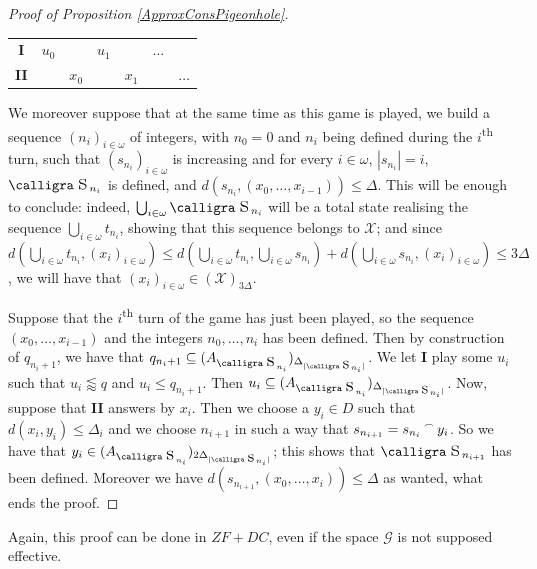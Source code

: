 \documentclass[a4paper,11pt]{article}
\theoremstyle{definition}
\numberwithin{equation}{section}
\newcommand{\X}{\mathcal{X}}
\newcommand{\G}{\mathcal{G}}
\newcommand{\I}{\textbf{I}}
\newcommand{\II}{\textbf{II}}
\newcommand{\st}{\text{{\calligra \LARGE s}}\,}
\newcommand{\stp}{\text{{\calligra \large s}}\,}
\newcommand{\Asti}[1]{A_{{\text{{\calligra \Large s}}\,}_{#1}}}
\newcommand{\concat}{%
  \mathbin{\raisebox{1ex}{\scalebox{.7}{$\frown$}}}%
}
\begin{document}
\begin{proof}[Proof of Proposition \ref{ApproxConsPigeonhole}]
\smallskip

\begin{tabular}{ccccccc}
\textbf{I} & $u_0$ & & $u_1$ & & $\hdots$ & \\
\textbf{II} & & $x_0$ & & $x_1$ & & $\hdots$ 
\end{tabular}

\smallskip

\noindent We moreover suppose that at the same time as this game is played, we build a sequence $(n_i)_{i \in \omega}$ of integers, with $n_0 = 0$ and $n_i$ being defined during the $i$\textsuperscript{th} turn, such that $(s_{n_i})_{i \in \omega}$ is increasing and for every $i \in \omega$, $|s_{n_i}| = i$, $\st_{n_i}$ is defined, and $d(s_{n_i}, (x_0, \ldots, x_{i - 1})) \leqslant \Delta$. This will be enough to conclude: indeed, $\bigcup_{i \in \omega} \st_{n_i}$ will be a total state realising the sequence $\bigcup_{i \in \omega} t_{n_i}$, showing that this sequence belongs to $\X$; and since $d\left(\bigcup_{i \in \omega} t_{n_i}, (x_i)_{i \in \omega}\right) \leqslant d\left(\bigcup_{i \in \omega} t_{n_i}, \bigcup_{i \in \omega} s_{n_i}\right) + d\left(\bigcup_{i \in \omega} s_{n_i}, (x_i)_{i \in \omega}\right) \leqslant 3 \Delta$, we will have that $(x_i)_{i \in \omega} \in (\X)_{3\Delta}$.

\smallskip

Suppose that the $i$\textsuperscript{th} turn of the game has just been played, so the sequence $(x_0, \ldots, x_{i - 1})$ and the integers $n_0, \ldots, n_i$ has been defined. Then by construction of $q_{n_i + 1}$, we have that $q_{n_i + 1} \subseteq (\Asti{n_i})_{\Delta_{|\stp_{n_i}|}}$. We let \I{} play some $u_i$ such that $u_i \lessapprox q$ and $u_i \leqslant q_{n_i + 1}$. Then $u_i \subseteq (\Asti{n_i})_{\Delta_{|\stp_{n_i}|}}$. Now, suppose that \II{} answers by $x_i$. Then we choose a $y_i \in D$ such that $d(x_i, y_i) \leqslant \Delta_i$ and we choose $n_{i + 1}$ in such a way that $s_{n_{i + 1}} = s_{n_i} \concat y_i$. So we have that $y_i \in (\Asti{n_i})_{2\Delta_{|\stp_{n_i}|}}$; this shows that $\st_{n_{i + 1}}$ has been defined. Moreover we have $d(s_{n_{i + 1}}, (x_0, \ldots, x_i)) \leqslant \Delta$ as wanted, what ends the proof.

\end{proof}

Again, this proof can be done in $ZF + DC$, even if the space $\G$ is not supposed effective.
\end{document}
